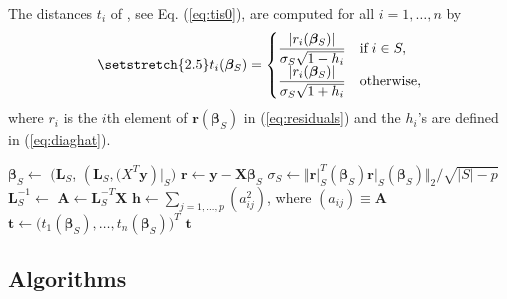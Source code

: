 \documentclass[a4paper,oneside,11pt,DIV=12]{scrartcl}
\begin{document}
The distances $t_i$ of \citet[][p. 288]{billor_hadi_etal_2000}, see Eq. (\ref{eq:tis0}), are computed for all $i=1,\ldots,n$ by 
\begin{equation}\label{eq:tis}
	\setstretch{2.5}
	t_i(\bm \beta_S) = \begin{cases}
		\displaystyle{\frac{\vert r_i(\bm \beta_S) \vert}{\sigma_S \sqrt{1 - h_i}}} & \text{if} \; i \in S, \\
		\displaystyle{\frac{\vert r_i(\bm \beta_S) \vert}{\sigma_S \sqrt{1 + h_i}}} & \text{otherwise}, 
	\end{cases}
\end{equation}
\noindent where $r_i$ is the $i$th element of $\bm r(\bm \beta_S)$ in (\ref{eq:residuals}) and the $h_i$'s are defined in (\ref{eq:diaghat}).


\begin{algorithmic}[1]
		\State $\bm \beta_S \gets$ $\big(\bm L_S$, $(\bm L_S, \bm (X^T \bm y)\vert_S$$\big)$
		\State $\bm r \gets \bm y - \bm X  \bm \beta_S$ 
		\State $\sigma_S \gets \big\Vert \bm r\vert_S^T(\bm \beta_S) \bm r\vert_S(\bm \beta_S) \big \Vert_2 / \sqrt{\vert S \vert - p}$ 
		\State $\bm L_S^{-1} \gets$ 
		\State $\bm A \gets \bm L_S^{-T}\bm X$
		\State $\bm h \gets \sum_{j =1, \ldots, p} (a_{ij}^2)$, \quad where $(a_{ij}) \equiv \bm A$
		\State $\bm t \gets \big(t_1(\bm \beta_S), \ldots, t_n(\bm \beta_S)\big)^T$ 
		\State \Return $\bm t$
	\EndFunction
\end{algorithmic}




\subsection{Algorithms}
\end{document}
